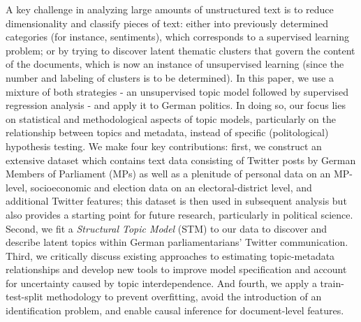 A key challenge in analyzing large amounts of unstructured text is to reduce dimensionality and classify pieces of text: either into previously determined categories (for instance, sentiments), which corresponds to a supervised learning problem; or by trying to discover latent thematic clusters that govern the content of the documents, which is now an instance of unsupervised learning (since the number and labeling of clusters is to be determined). In this paper, we use a mixture of both strategies - an unsupervised topic model followed by supervised regression analysis - and apply it to German politics. In doing so, our focus lies on statistical and methodological aspects of topic models, particularly on the relationship between topics and metadata, instead of specific (politological) hypothesis testing. We make four key contributions: first, we construct an extensive dataset which contains text data consisting of Twitter posts by German Members of Parliament (MPs) as well as a plenitude of personal data on an MP-level, socioeconomic and election data on an electoral-district level, and additional Twitter features; this dataset is then used in subsequent analysis but also provides a starting point for future research, particularly in political science. Second, we fit a \textit{Structural Topic Model} (STM) to our data to discover and describe latent topics within German parliamentarians' Twitter communication. Third, we critically discuss existing approaches to estimating topic-metadata relationships and develop new tools to improve model specification and account for uncertainty caused by topic interdependence. And fourth, we apply a train-test-split methodology to prevent overfitting, avoid the introduction of an identification problem, and enable causal inference for document-level features.

